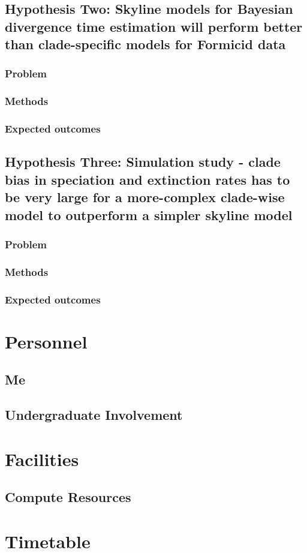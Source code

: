 \documentclass[]{article}
\begin{document}
\subsection{Hypothesis Two: Skyline models for Bayesian divergence time estimation will perform better than clade-specific models for Formicid data}
\subsubsection{Problem}
\subsubsection{Methods}
\subsubsection{Expected outcomes}
	
\subsection{Hypothesis Three: Simulation study - clade bias in speciation and extinction rates has to be very large for a more-complex clade-wise model to outperform a simpler skyline model}
\subsubsection{Problem}
\subsubsection{Methods}
\subsubsection{Expected outcomes}

\section{Personnel}
\subsection{Me}
\subsection{Undergraduate Involvement}
	
\section{Facilities}
\subsection{Compute Resources}

\section{Timetable}
	
\end{document}
